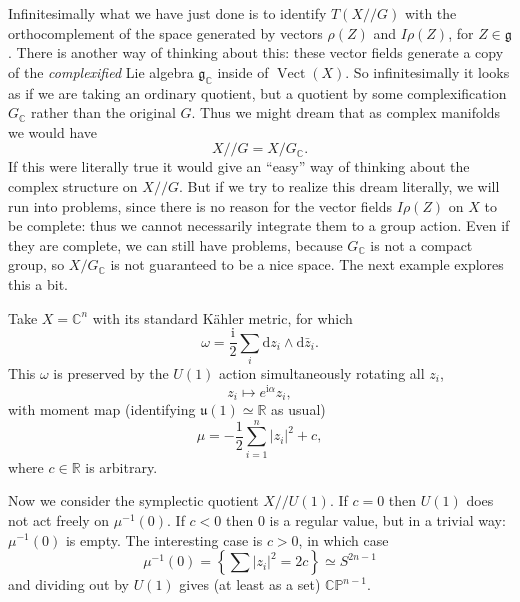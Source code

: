 \documentclass[12pt,letterpaper,reqno]{article}
\numberwithin{equation}{section}
\newcommand{\fg}{{\mathfrak g}}
\newcommand{\fu}{{\mathfrak u}}
\newcommand{\R}{\ensuremath{\mathbb R}}
\newcommand{\C}{\ensuremath{\mathbb C}}
\newcommand{\PP}{\ensuremath{\mathbb P}}
\newcommand{\half}{\ensuremath{\frac{1}{2}}}
\newcommand{\kahler}{K\"ahler\xspace}
\newcommand{\kq}{/\!\!/}
\newcommand{\I}{{\mathrm i}}
\newcommand{\de}{\mathrm{d}}
\newcommand{\abs}[1]{\lvert#1\rvert}
\newcommand{\ti}[1]{\textit{#1}}
\DeclareMathOperator{\Vect}{Vect}
\begin{document}
Infinitesimally what we have just done is to 
identify $T(X \kq G)$ with the orthocomplement
of the space generated by 
vectors $\rho(Z)$ and $I \rho(Z)$, for $Z \in \fg$.
There is another way of thinking about this:
these vector fields generate a copy of the \ti{complexified}
Lie algebra $\fg_\C$ inside of $\Vect(X)$.
So infinitesimally it looks as if we are
taking an ordinary quotient, but a quotient
by some complexification $G_\C$ rather than
the original $G$. 
Thus we might dream that as complex manifolds we would have
\begin{equation}
  X \kq G = X / G_\C.
\end{equation}
If this were literally true it would give an ``easy'' way of thinking about
the complex structure on $X \kq G$.
But if we try to realize this dream literally, we will run into 
problems, since there is no reason for the vector fields
$I \rho(Z)$ on $X$ to be complete: thus we cannot necessarily
integrate them to a group action.
Even if they are complete, 
we can still have problems, because $G_\C$ 
is not a compact group, so $X / G_\C$
is not guaranteed to be a nice space.
The next example
explores this a bit.

\begin{example}[Projective space as a \kahler quotient]
Take $X = \C^n$ with its standard \kahler metric, for
which
\begin{equation}
\omega = \frac{\I}{2} \sum_i \de z_i \wedge \de \bar{z}_i.
\end{equation}
This $\omega$ is preserved by the $U(1)$ action simultaneously
rotating all $z_i$,
\begin{equation}
  z_i \mapsto e^{\I \alpha} z_i,
\end{equation}
with moment map (identifying $\fu(1) \simeq \R$ as usual)
\begin{equation}
  \mu = - \half \sum_{i=1}^n \abs{z_i}^2 + c,
\end{equation}
where $c \in \R$ is arbitrary.

Now we consider the symplectic quotient $X \kq U(1)$. If $c = 0$
then $U(1)$ does not act freely on $\mu^{-1}(0)$. If $c < 0$ then $0$
is a regular value, but in a trivial way: $\mu^{-1}(0)$ is empty.
The interesting case is $c > 0$, in which case
\begin{equation}
  \mu^{-1}(0) = \left\{ \sum \abs{z_i}^2 = 2c \right\} \simeq S^{2n-1}
\end{equation}
and dividing out by $U(1)$ gives (at least as a set) $\C\PP^{n-1}$.
\end{example}
\end{document}
